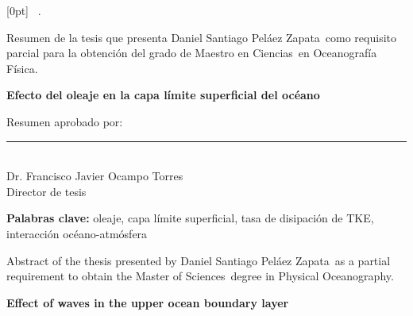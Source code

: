 \documentclass[11pt]{report}
\def\thesisauthor{Daniel Santiago Peláez Zapata}
\def\thesistitle{Efecto del oleaje en la capa límite superficial del océano}
\def\thesissubject{Oceanografía Física}
\def\thesiskindtitle{Maestro en Ciencias}
\def\thesiskeywords{oleaje, capa límite superficial, tasa de disipación de TKE,
                    interacción océano-atmósfera}
\def\thesistitleenglish{Effect of waves in the upper ocean boundary layer}
\def\thesissubjectenglish{Physical Oceanography}
\def\thesiskindtitleenglish{Master of Sciences}
\newcommand{\comite}[2]{#1 \\ {\small #2}}
\begin{document}


  [0pt]%
  {\bfseries}%
  {\chaptername\ \thecontentslabel.\quad}%
  {}%
  {\hfill\contentspage}%



\thispagestyle{special}

Resumen de la tesis que presenta \thesisauthor~como requisito parcial para la
obtención del grado de \thesiskindtitle~en \thesissubject. 

\vspace{2em}
\begin{center}
  \Large{\textbf{\thesistitle}} \\
\end{center}

\vspace{1em}
Resumen aprobado por:
\vspace{1em}

\hfill
\parbox{0.5\textwidth}{
  \begin{center}
      \rule{0.5\textwidth}{.5pt} \\
      \comite{Dr. Francisco Javier Ocampo Torres}{Director de tesis}
  \end{center}
}

\vspace{3em}

\vfill
\textbf{Palabras clave:} \thesiskeywords

\newpage
\thispagestyle{special}

Abstract of the thesis presented by \thesisauthor~as a partial requirement to
obtain the \thesiskindtitleenglish~degree in \thesissubjectenglish. 

\vspace{2em}
\begin{center}
  \Large{\textbf{\thesistitleenglish}} \\
\end{center}
\end{document}

